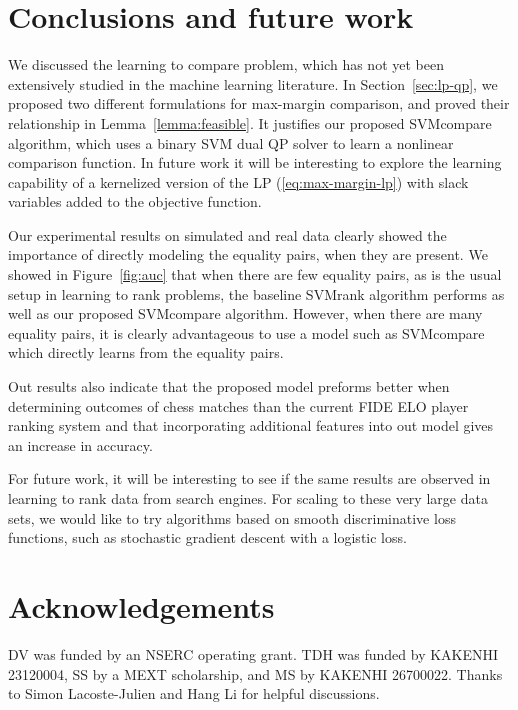 \documentclass[twoside,11pt]{article}
\newcommand{\changed}[1]{
  #1
}
\begin{document}
\section{Conclusions and future work}
\label{sec:conclusions}

We discussed the learning to compare problem, which has not yet been
extensively studied in the machine learning literature. In
Section~\ref{sec:lp-qp}, we proposed two different formulations for
max-margin comparison, and proved their relationship in
Lemma~\ref{lemma:feasible}. It justifies our proposed SVMcompare
algorithm, which uses a binary SVM dual QP solver to learn a nonlinear
comparison function. \changed{In future work it will be interesting to explore
the learning capability of a kernelized version of the LP
(\ref{eq:max-margin-lp}) with slack variables added to the objective
function.}

Our experimental results on simulated and real data clearly showed the
importance of directly modeling the equality pairs, when they are
present. We showed in Figure~\ref{fig:auc} that when there are few
equality pairs, as is the usual setup in learning to rank problems,
the baseline SVMrank algorithm performs as well as our proposed
SVMcompare algorithm. However, when there are many equality pairs, it
is clearly advantageous to use a model such as SVMcompare which
directly learns from the equality pairs.

Out results also indicate that the proposed model preforms better when determining outcomes of chess matches than the current FIDE ELO player ranking system and that incorporating additional features into out model gives an increase in accuracy.

For future work, it will be interesting to see if the same results are
observed in learning to rank data from search engines. For scaling to
these very large data sets, we would like to try algorithms based on
smooth discriminative loss functions, such as stochastic gradient
descent with a logistic loss.

\section*{Acknowledgements}
DV was funded by an NSERC operating grant. TDH was funded by KAKENHI 23120004, SS by a
MEXT scholarship, and MS by KAKENHI 26700022. 
Thanks%
 to Simon Lacoste-Julien and Hang Li for helpful discussions.




\end{document}
